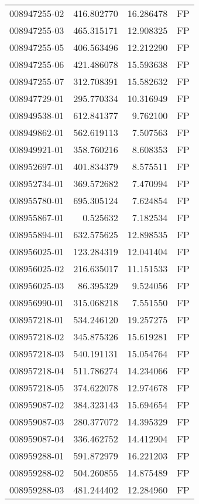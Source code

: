 \begin{tabular}{lrrl}
008947255-02 &  416.802770 &    16.286478 &   FP \\
008947255-03 &  465.315171 &    12.908325 &   FP \\
008947255-05 &  406.563496 &    12.212290 &   FP \\
008947255-06 &  421.486078 &    15.593638 &   FP \\
008947255-07 &  312.708391 &    15.582632 &   FP \\
008947729-01 &  295.770334 &    10.316949 &   FP \\
008949538-01 &  612.841377 &     9.762100 &   FP \\
008949862-01 &  562.619113 &     7.507563 &   FP \\
008949921-01 &  358.760216 &     8.608353 &   FP \\
008952697-01 &  401.834379 &     8.575511 &   FP \\
008952734-01 &  369.572682 &     7.470994 &   FP \\
008955780-01 &  695.305124 &     7.624854 &   FP \\
008955867-01 &    0.525632 &     7.182534 &   FP \\
008955894-01 &  632.575625 &    12.898535 &   FP \\
008956025-01 &  123.284319 &    12.041404 &   FP \\
008956025-02 &  216.635017 &    11.151533 &   FP \\
008956025-03 &   86.395329 &     9.524056 &   FP \\
008956990-01 &  315.068218 &     7.551550 &   FP \\
008957218-01 &  534.246120 &    19.257275 &   FP \\
008957218-02 &  345.875326 &    15.619281 &   FP \\
008957218-03 &  540.191131 &    15.054764 &   FP \\
008957218-04 &  511.786274 &    14.234066 &   FP \\
008957218-05 &  374.622078 &    12.974678 &   FP \\
008959087-02 &  384.323143 &    15.694654 &   FP \\
008959087-03 &  280.377072 &    14.395329 &   FP \\
008959087-04 &  336.462752 &    14.412904 &   FP \\
008959288-01 &  591.872979 &    16.221203 &   FP \\
008959288-02 &  504.260855 &    14.875489 &   FP \\
008959288-03 &  481.244402 &    12.284960 &   FP \\

\end{tabular}

